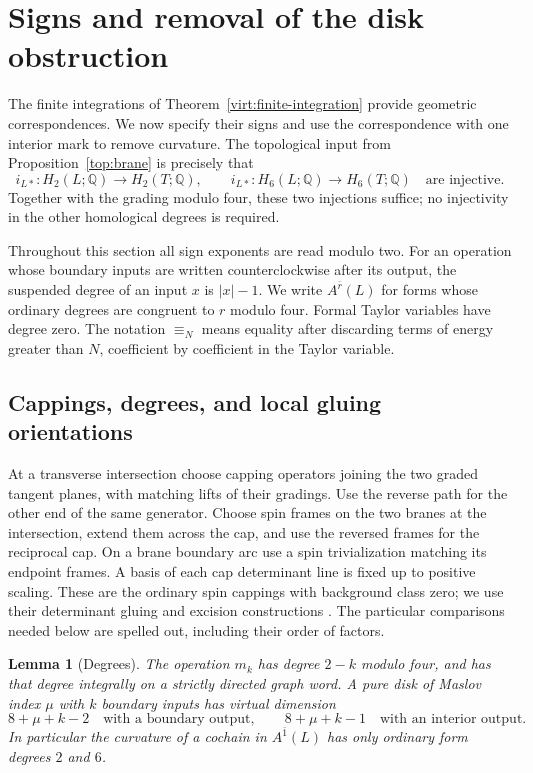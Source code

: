 \documentclass[11pt]{article}
\newtheorem{lemma}[theorem]{Lemma}
\theoremstyle{definition}
\theoremstyle{remark}
\numberwithin{equation}{section}
\begin{document}
\section{Signs and removal of the disk obstruction}
\label{obs:section}

The finite integrations of Theorem~\ref{virt:finite-integration} provide
geometric correspondences.  We now specify their signs and use the
correspondence with one interior mark to remove curvature.  The topological
input from Proposition~\ref{top:brane} is precisely that
\begin{equation}
 \label{obs:topological-input}
 i_{L*}:H_2(L;\mathbb Q)\longrightarrow H_2(T;\mathbb Q),\qquad
 i_{L*}:H_6(L;\mathbb Q)\longrightarrow H_6(T;\mathbb Q)
 \quad\text{are injective}.
\end{equation}
Together with the grading modulo four, these two injections suffice; no
injectivity in the other homological degrees is required.

Throughout this section all sign exponents are read modulo two.  For an
operation whose boundary inputs are written counterclockwise after its
output, the suspended degree of an input $x$ is $|x|-1$.  We write
$A^{\bar r}(L)$ for forms whose ordinary degrees are congruent to $r$
modulo four.  Formal Taylor variables have degree zero.  The notation
$\equiv_N$ means equality after discarding terms of energy greater than
$N$, coefficient by coefficient in the Taylor variable.

\subsection{Cappings, degrees, and local gluing orientations}

At a transverse intersection choose capping operators joining the two
graded tangent planes, with matching lifts of their gradings.  Use the
reverse path for the other end of the same generator.  Choose spin frames
on the two branes at the intersection, extend them across the cap, and
use the reversed frames for the reciprocal cap.  On a brane boundary arc
use a spin trivialization matching its endpoint frames.  A basis of each
cap determinant line is fixed up to positive scaling.  These are the
ordinary spin cappings with background class zero; we use their
determinant gluing and excision constructions
\cite[Section~5]{akaho-joyce}.  The particular comparisons needed below are
spelled out, including their order of factors.

\begin{lemma}[Degrees]\label{obs:degree}
The operation $m_k$ has degree $2-k$ modulo four, and has that degree
integrally on a strictly directed graph word.  A pure disk of Maslov
index $\mu$ with $k$ boundary inputs has virtual dimension
\[
 8+\mu+k-2
 \quad\text{with a boundary output},\qquad
 8+\mu+k-1
 \quad\text{with an interior output}.
\]
In particular the curvature of a cochain in $A^{\bar1}(L)$ has only
ordinary form degrees $2$ and $6$.
\end{lemma}
\end{document}
